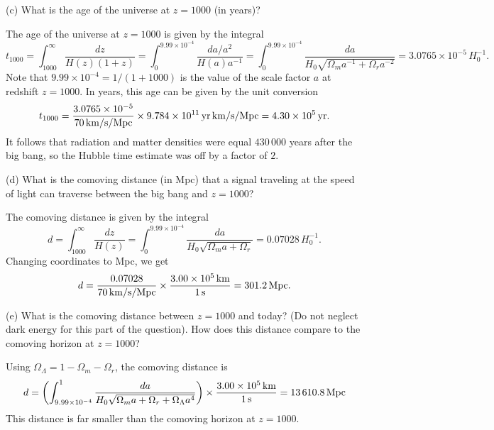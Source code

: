 \documentclass{lkx_pset}
\begin{document}
\begin{parts}
  \begin{part}{(c)}
    What is the age of the universe at $z=1000$ (in years)?
  \end{part}

  The age of the universe at $z=1000$ is given by the integral
  \[
    t_{1000} = \int_{1000}^\infty \frac{dz}{H(z)(1+z)} = \int_0^{9.99\times 10^{-4}}\frac{da/a^2}{H(a)a^{-1}} = \int_0^{9.99\times 10^{-4}}\frac{da}{H_0\sqrt{\Omega_m a^{-1} + \Omega_r a^{-2}}} = 3.0765\times 10^{-5}\,H_0^{-1}.
  \]
  Note that $9.99\times 10^{-4}=1/(1+1000)$ is the value of the scale factor $a$ at redshift $z=1000$. In years, this age can be given by the unit conversion
  \[
    t_{1000}=\frac{3.0765\times 10^{-5}}{\Hsi{70}}\times \Hyrsi{9.784e11}=\yrsi{4.30e5}.
  \]
  It follows that radiation and matter densities were equal $430\,000$ years after the big bang, so the Hubble time estimate was off by a factor of $2$.

  \begin{part}{(d)}
    What is the comoving distance (in Mpc) that a signal traveling at the speed of light can traverse between the big bang and $z=1000$?
  \end{part}

  The comoving distance is  given by the integral
  \[
    d=\int_{1000}^\infty \frac{dz}{H(z)} = \int_0^{9.99\times 10^{-4}}\frac{da}{H_0\sqrt{\Omega_m a + \Omega_r}} = 0.07028\,H_0^{-1}.
  \]
  Changing coordinates to Mpc, we get
  \[
    d = \frac{0.07028}{\Hsi{70}}\times \frac{\kmsi{3.00e5}}{\ssi{1}}=\Mpcsi{301.2}.
  \]

  \begin{part}{(e)}
    What is the comoving distance between $z=1000$ and today? (Do not neglect dark energy for this part of the question). How does this distance compare to the comoving horizon at $z=1000$?
  \end{part}

  Using $\Omega_\Lambda = 1-\Omega_m - \Omega_r$, the comoving distance is
  \[
    d = \left(\int_{9.99\times 10^{-4}}^1 \frac{da}{H_0\sqrt{\Omega_m a + \Omega_r + \Omega_\Lambda a^4}}\right)\times \frac{\kmsi{3.00e5}}{\ssi{1}} = \Mpcsi{13610.8}
  \]
  This distance is far smaller than the comoving horizon at $z=1000$.
\end{parts}
\end{document}
